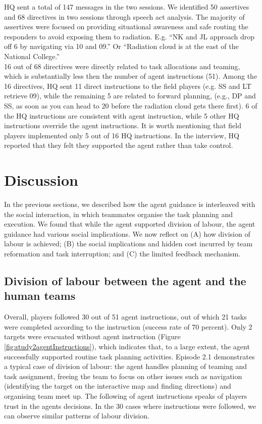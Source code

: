 HQ sent a total of 147 messages in the two sessions. We identified 50 assertives and 68 directives in two sessions through speech act analysis. The majority of assertives were focused on providing situational awareness and safe routing the responders to avoid exposing them to radiation. E.g. ``NK and JL approach drop off 6 by navigating via 10 and 09.'' Or ``Radiation cloud is at the east of the National College.''\\

16 out of 68 directives were directly related to task allocations and teaming, which is substantially less then the number of agent instructions (51). Among the 16 directives, HQ sent 11 direct instructions to the field players (e.g. SS and LT retrieve 09), while the remaining 5 are related to forward planning, (e.g., DP and SS, as soon as you can head to 20 before the radiation cloud gets there first). 6 of the HQ instructions are consistent with agent instruction, while 5 other HQ instructions override the agent instructions. It is worth mentioning that field players implemented only 5 out of 16 HQ instructions. In the interview, HQ reported that they felt they supported the agent rather than take control. \\




\section{Discussion}
In the previous sections, we described how the agent guidance is interleaved with the social interaction, in which teammates organise the task planning and execution. We found that while the agent supported division of labour, the agent guidance had various social implications. We now reflect on (A) how division of labour is achieved; (B) the social implications and hidden cost incurred by team reformation and task interruption; and (C) the limited feedback mechanism. \\

\subsection{Division of labour between the agent and the human teams}
Overall, players followed 30 out of 51 agent instructions, out of which 21 tasks were completed according to the instruction (success rate of 70 percent). Only 2 targets were evacuated without agent instruction (Figure \ref{fig:study2agentInstructions}), which indicates that, to a large extent, the agent successfully supported routine task planning activities. Episode 2.1 demonstrates a typical case of division of labour: the agent handles planning of teaming and task assignment, freeing the team to focus on other issues such as navigation (identifying the target on the interactive map and finding directions) and organising team meet up.  The following of agent instructions speaks of players trust in the agents decisions. In the 30 cases where instructions were followed, we can observe similar patterns of labour division.\\

